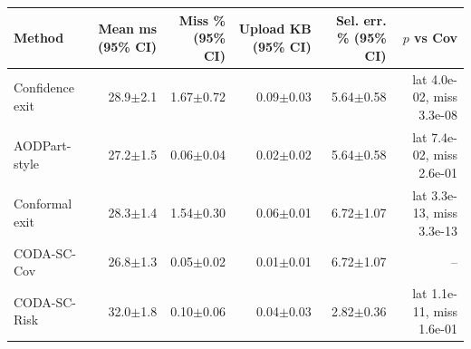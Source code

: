 \begin{tabular}{lrrrrr}
\toprule
Method & Mean ms (95\% CI) & Miss \% (95\% CI) & Upload KB (95\% CI) & Sel. err. \% (95\% CI) & $p$ vs Cov \\
\midrule
Confidence exit & 28.9$\pm$2.1 & 1.67$\pm$0.72 & 0.09$\pm$0.03 & 5.64$\pm$0.58 & lat 4.0e-02, miss 3.3e-08 \\
AODPart-style & 27.2$\pm$1.5 & 0.06$\pm$0.04 & 0.02$\pm$0.02 & 5.64$\pm$0.58 & lat 7.4e-02, miss 2.6e-01 \\
Conformal exit & 28.3$\pm$1.4 & 1.54$\pm$0.30 & 0.06$\pm$0.01 & 6.72$\pm$1.07 & lat 3.3e-13, miss 3.3e-13 \\
CODA-SC-Cov & 26.8$\pm$1.3 & 0.05$\pm$0.02 & 0.01$\pm$0.01 & 6.72$\pm$1.07 & -- \\
CODA-SC-Risk & 32.0$\pm$1.8 & 0.10$\pm$0.06 & 0.04$\pm$0.03 & 2.82$\pm$0.36 & lat 1.1e-11, miss 1.6e-01 \\
\bottomrule
\end{tabular}
